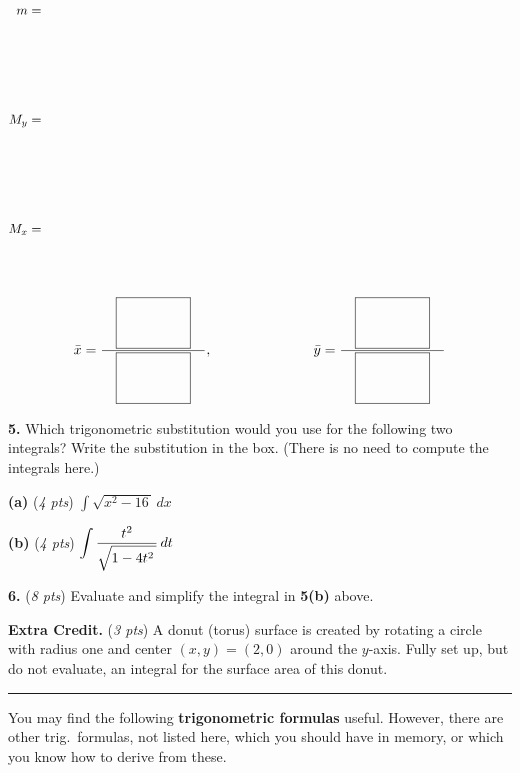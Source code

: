 \documentclass[11pt]{amsart}
\newcommand{\ds}{\displaystyle}
\newcommand{\prob}[1]{\bigskip\noindent\textbf{#1.} }
\newcommand{\pts}[1]{(\emph{#1 pts})}
\newcommand{\probpts}[2]{\prob{#1} \pts{#2} \quad}
\newcommand{\epartpts}[2]{\medskip\noindent \textbf{(#1)} \pts{#2} \quad}
\begin{document}
\newcommand{\fracboxes}{\frac{\quad \fbox{{\Huge $\strut$} \hspace{0.6in}} \quad}{\fbox{{\Huge $\strut$} \hspace{0.6in}}}}
{\large
\begin{align*}
m &= \hspace{5.0in} \\
{\Huge \strut} \\
{\Huge \strut} \\
M_y &= \\
{\Huge \strut} \\
{\Huge \strut} \\
M_x &= \\
{\Huge \strut} \\
\end{align*}

\vspace{0.5in}

  $$\bar x = \fracboxes, \hspace{1.0in} \bar y = \fracboxes$$
}

\clearpage\newpage
\prob{5}  Which trigonometric substitution would you use for the following two integrals?  Write the substitution in the box.  (There is no need to compute the integrals here.)

\epartpts{a}{4} $\ds \int \sqrt{x^2 - 16\,}\,dx$

\vspace{0.2in}

\hfill\fbox{{\Huge $\strut$} \hspace{3.0in}}
\bigskip

\epartpts{b}{4} $\ds \int \frac{t^2}{\sqrt{1 - 4t^2\strut\,}}\,dt$

\vspace{0.2in}

\hfill\fbox{{\Huge $\strut$} \hspace{3.0in}}

\bigskip\bigskip\bigskip

\probpts{6}{8}  Evaluate and simplify the integral in \textbf{5(b)} above.
\vfill

\clearpage\newpage
\probpts{Extra Credit}{3}  A donut (torus) surface is created by rotating a circle with radius one and center $(x,y)=(2,0)$ around the $y$-axis.  Fully set up, but do not evaluate, an integral for the surface area of this donut.
\vfill

\noindent \hrule

\vspace{0.2in}
\noindent You may find the following \textbf{trigonometric formulas} useful.  However, there are other trig.~formulas, not listed here, which you should have in memory, or which you know how to derive from these.
\end{document}
